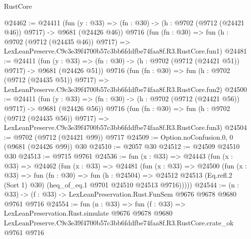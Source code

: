 \begin{lexlean}{RustCore}
\begin{coremodule}
@24462 := @24411
    (fun (y : @33) => (fn : @30) -> (h : @9702 (@9712 (@24421 @46)) @9717) -> @9681 (@24426 @46))
    @9716
    (fun (fn : @30) =>
    fun (h : @9702 (@9712 (@24435 @46)) @9717) =>
    LexLeanPreserve.C9c3e39f4700b57c3bb6fddfbe74faa8f.R3.RustCore.fun1)
@24481 := @24411
    (fun (y : @33) => (fn : @30) -> (h : @9702 (@9712 (@24421 @51)) @9717) -> @9681 (@24426 @51))
    @9716
    (fun (fn : @30) =>
    fun (h : @9702 (@9712 (@24435 @51)) @9717) =>
    LexLeanPreserve.C9c3e39f4700b57c3bb6fddfbe74faa8f.R3.RustCore.fun2)
@24500 := @24411
    (fun (y : @33) => (fn : @30) -> (h : @9702 (@9712 (@24421 @56)) @9717) -> @9681 (@24426 @56))
    @9716
    (fun (fn : @30) =>
    fun (h : @9702 (@9712 (@24435 @56)) @9717) =>
    LexLeanPreserve.C9c3e39f4700b57c3bb6fddfbe74faa8f.R3.RustCore.fun3)
@24504 := @9702 (@9712 (@24421 @99)) @9717
@24509 := Option.noConfusion.{0, 0} (@9681 (@24426 @99)) @30
@24510 := @2057 @30
@24512 := @24509 @24510 @30
@24513 := @9715 @9761
@24536 := fun (x : @33) =>
  @24443
    (fun (x : @33) =>
    @24462
      (fun (x : @33) =>
      @24481
        (fun (x : @33) =>
        @24500
          (fun (x : @33) =>
          fun (fn : @30) =>
          fun (h : @24504) =>
          @24512 @24513 (Eq.refl.{2} (Sort 1) @30) (heq_of_eq.{1} @9701 @24510 @24513 @9716)))))
@24544 := (n : @33) -> (f : @33) -> LexLeanPreservation.Rust.FunSem @9676 @9678 @9680 @9761 @9716
@24554 := fun (n : @33) =>
  fun (f : @33) =>
  LexLeanPreservation.Rust.simulate
    @9676
    @9678
    @9680
    LexLeanPreserve.C9c3e39f4700b57c3bb6fddfbe74faa8f.R3.RustCore.crate_ok
    @9761
    @9716
\end{coremodule}
\end{lexlean}
